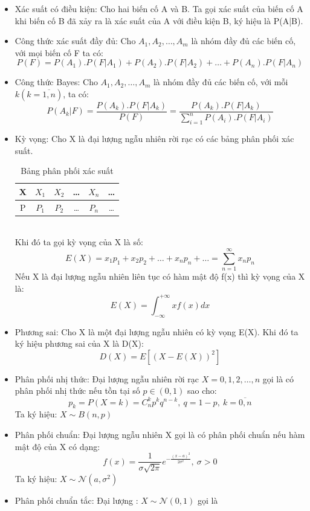 \begin{itemize}
  \item Xác suất có điều kiện: Cho hai biến cố A và B. Ta gọi xác suất của biến
  cố A khi biến cố B đã xảy ra là xác suất của A với điều kiện B, ký hiệu là P(A|B).
  \item Công thức xác suất đầy đủ: Cho $A_1, A_2, \dots,A_m$ là nhóm đầy đủ các
  biến cố, với mọi biến cố F ta có:\\
  \[
  P(F) = P(A_1).P(F|A_1) + P(A_2).P(F|A_2) + \dots + P(A_n).P(F|A_n) 
  \]
  \item Công thức Bayes: Cho $A_1, A_2, \dots,A_m$ là nhóm đầy đủ các biến cố,
  với mỗi $k (k = \overline{1,n})$, ta có:
  \[
  P(A_k|F) = \frac{P(A_k).P(F|A_k)}{P(F)} = \frac{P(A_k).P(F|
  A_k)}{\sum_{i=1}^{n} P(A_i).P(F| A_i)}
  \]
  \item Kỳ vọng: Cho X là đại lượng ngẫu nhiên rời rạc có các bảng phân phối xác
  suất.
  \begin{table}[h]
  \centering
  \begin{tabular}{|c|c|c|c|c|c|}
  \hline
  X & $X_1$ & $X_2$ & \dots & $X_n$ & \dots\\
  \hline
  P & $P_1$ & $P_2$ & \dots & $P_n$ & \dots\\
  \hline
  \end{tabular}
  \caption{Bảng phân phối xác suất}
  \end{table}\\
  Khi đó ta gọi kỳ vọng của X là số:
  \[
  E(X) = x_1p_1 + x_2p_2 + \dots + x_np_n + \dots = \sum_{n=1}^{\infty} x_np_n
  \]
  Nếu X là đại lượng ngẫu nhiên liên tục có hàm mật độ f(x) thì kỳ vọng của X
  là:
  \[
  E(X) = \int_{-\infty}^{+\infty} xf(x) dx
  \]
  \item Phương sai: Cho X là một đại lượng ngẫu nhiên có kỳ vọng E(X). Khi đó ta
  ký hiệu phương sai của X là D(X):
  \[ D(X) = E[(X-E(X))^2] \]
  \item Phân phối nhị thức: Đại lượng ngẫu nhiên rời rạc $X={0,1,2,\dots,n}$ gọi
  là có phân phối nhị thức nếu tồn tại số $p \in (0,1)$ sao cho:
  \[ p_k = P(X=k) = C_{n}^{k}p^kq^{n-k},\:q=1-p,\:k=\overline{0,n} \]
  Ta ký hiệu: $X \sim B(n,p)$ 
  \item Phân phối chuẩn: Đại lượng ngẫu nhiên X gọi là có phân phối chuẩn nếu
  hàm mật độ của X có dạng:
  \[ f(x) = \frac{1}{\sigma \sqrt{2\pi}}e^{-\frac{(x-a)^2}{2\sigma^2}},\:\sigma
  > 0
  \]
  Ta ký hiệu: $X \sim \mathcal{N}(a,\sigma^2)$
  \item Phân phối chuẩn tắc: Đại lượng : $X \sim \mathcal{N}(0,1)$ gọi là

\end{itemize}
